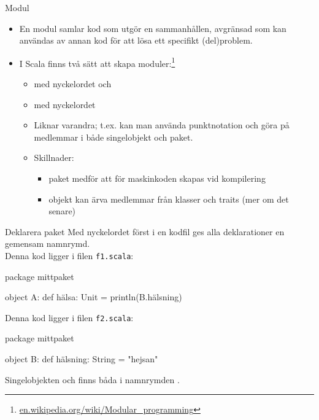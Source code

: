\begin{Slide}{Modul}

  \begin{itemize}
    \item En modul samlar kod som utgör en sammanhållen, avgränsad  som kan användas av annan kod  för att lösa ett specifikt (del)problem.
    \item I Scala finns två sätt att skapa moduler:\footnote{\href{https://en.wikipedia.org/wiki/Modular_programming}{en.wikipedia.org/wiki/Modular\_programming}}
    \begin{itemize}
      \item {} med nyckelordet  och
      \item {} med nyckelordet 
      \pause
      \item Liknar varandra; t.ex. kan man använda punktnotation och göra  på medlemmar i både singelobjekt och paket.
      \pause
      \item Skillnader:
      \begin{itemize} 
        \item paket medför att  för maskinkoden skapas vid kompilering
        \item objekt kan ärva medlemmar från klasser och traits (mer om det senare)
      \end{itemize}
    \end{itemize}
  
  \end{itemize}
\end{Slide}

\begin{Slide}{Deklarera paket}
Med nyckelordet  först i en kodfil ges alla deklarationer en gemensam namnrymd.\\
\vspace{1em}
Denna kod ligger i filen \texttt{f1.scala}:
\begin{Code}
package mittpaket

object A: 
  def hälsa: Unit = println(B.hälsning)
\end{Code}

Denna kod ligger i filen \texttt{f2.scala}:
\begin{Code}
package mittpaket

object B:
  def hälsning: String = "hejsan"
\end{Code}
Singelobjekten  och  finns båda i namnrymden .
\end{Slide}

